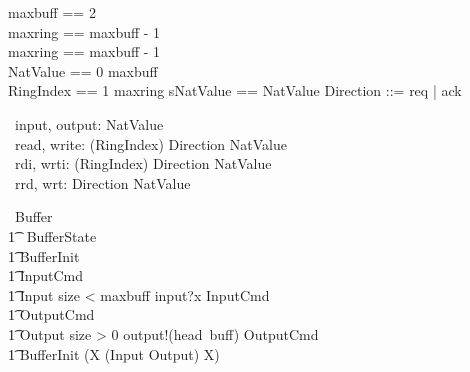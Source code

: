 \documentclass{article} %
\begin{document}

\begin{zed}
    maxbuff == 2 \\
    maxring == maxbuff - 1 \\
    maxring == maxbuff - 1 \\
    NatValue == 0 \upto maxbuff \\
    RingIndex == 1 \upto maxring
    \also sNatValue == \seq NatValue
    \also Direction ::= req | ack
\end{zed}

\begin{circus}
	\circchannel\ input, output: NatValue \\
	\circchannel\ read, write: (RingIndex) \cross Direction \cross NatValue \\
	\circchannel\ rdi, wrti: (RingIndex) \cross Direction \cross NatValue \\
  \circchannel\ rrd, wrt: Direction \cross NatValue
\end{circus}


\begin{circus}
	\circprocess\ Buffer \circdef \circbegin \\
    	\t1 \circstate\ BufferState  \\
    	\t1	BufferInit  \\
		\t1 InputCmd  \\
        \t1 Input \circdef \lcircguard size < maxbuff \rcircguard \circguard input?x \then \lschexpract InputCmd \rschexpract \\
		\t1 OutputCmd  \\
        \t1 Output \circdef \lcircguard size > 0 \rcircguard \circguard output!(head~buff) \then \lschexpract OutputCmd \rschexpract \\
	\t1 \circspot \lschexpract BufferInit \rschexpract \circseq (\circmu X \circspot (Input \extchoice Output) \circseq X) \\
	\circend
\end{circus}
\end{document}
